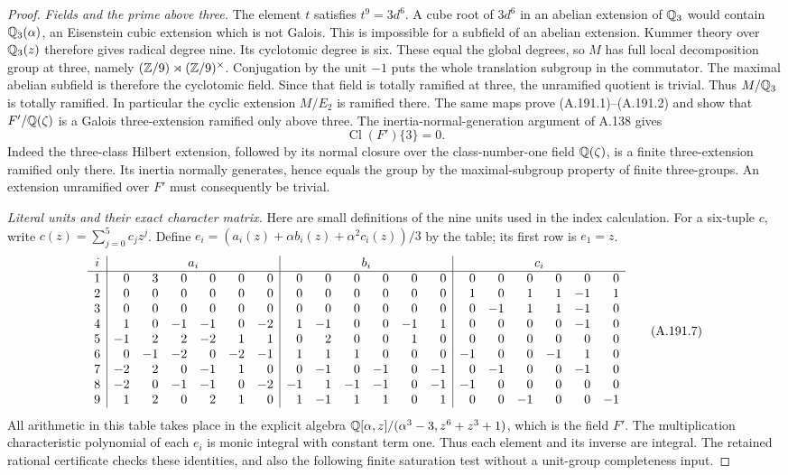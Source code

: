 \begin{proof}
\emph{Fields and the prime above three.}
The element \(t\) satisfies \(t^9=3d^6\).
A cube root of \(3d^6\) in an abelian extension of \(\mathbb Q_3\)
would contain \(\mathbb Q_3(\alpha)\), an Eisenstein cubic extension
which is not Galois.  This is impossible for a subfield of an
abelian extension.  Kummer theory over \(\mathbb Q_3(z)\) therefore
gives radical degree nine.  Its cyclotomic degree is six.
These equal the global degrees, so \(M\) has full local
decomposition group at three, namely
\((\mathbb Z/9)\rtimes(\mathbb Z/9)^\times\).
Conjugation by the unit \(-1\) puts the whole translation
subgroup in the commutator.  The maximal abelian subfield is
therefore the cyclotomic field.  Since that field is totally
ramified at three, the unramified quotient is trivial.
Thus \(M/\mathbb Q_3\) is totally ramified.  In particular the
cyclic extension \(M/E_2\) is ramified there.
The same maps prove (A.191.1)--(A.191.2) and show that
\(F'/\mathbb Q(\zeta)\) is a Galois three-extension ramified only
above three.  The inertia-normal-generation argument of
A.138 gives
\[
                 \operatorname{Cl}(F')\{3\}=0.
\tag{A.191.6}
\]
Indeed the three-class Hilbert extension, followed by its
normal closure over the class-number-one field \(\mathbb Q(\zeta)\),
is a finite three-extension ramified only there.  Its inertia
normally generates, hence equals the group by the maximal-subgroup
property of finite three-groups.  An extension unramified over
\(F'\) must consequently be trivial.

\emph{Literal units and their exact character matrix.}
Here are small definitions of the nine units used in the index
calculation.  For a six-tuple \(c\), write
\(c(z)=\sum_{j=0}^5c_jz^j\).  Define
\(e_i=(a_i(z)+\alpha b_i(z)+\alpha^2c_i(z))/3\)
by the table; its first row is \(e_1=z\).
\begingroup
\setlength{\arraycolsep}{3pt}
\[
\begin{array}{c|r r r r r r|r r r r r r|r r r r r r}
 i&\multicolumn{6}{c|}{a_i}&\multicolumn{6}{c|}{b_i}&\multicolumn{6}{c}{c_i}\\ \hline
1&0&3&0&0&0&0&0&0&0&0&0&0&0&0&0&0&0&0\\
2&0&0&0&0&0&0&0&0&0&0&0&0&1&0&1&1&-1&1\\
3&0&0&0&0&0&0&0&0&0&0&0&0&0&-1&1&1&-1&0\\
4&1&0&-1&-1&0&-2&1&-1&0&0&-1&1&0&0&0&0&-1&0\\
5&-1&2&2&-2&1&1&0&2&0&0&1&0&0&0&0&0&0&0\\
6&0&-1&-2&0&-2&-1&1&1&1&0&0&0&-1&0&0&-1&1&0\\
7&-2&2&0&-1&1&0&0&-1&0&-1&0&-1&0&-1&0&0&-1&0\\
8&-2&0&-1&-1&0&-2&-1&1&-1&-1&0&-1&-1&0&0&0&0&0\\
9&1&2&0&2&1&0&1&-1&1&1&0&1&0&0&-1&0&0&-1
\end{array}
\tag{A.191.7}
\]
\endgroup
All arithmetic in this table takes place in the explicit algebra
\(\mathbb Q[\alpha,z]/(\alpha^3-3,z^6+z^3+1)\), which is the
field \(F'\).  The multiplication characteristic polynomial of
each \(e_i\) is monic integral with constant term one.  Thus
each element and its inverse are integral.  The retained rational
certificate checks these identities, and also the following
finite saturation test without a unit-group completeness input.


\end{proof}
